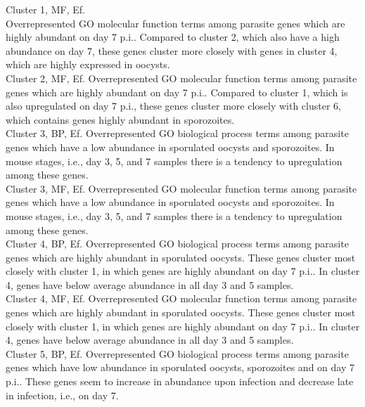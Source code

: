 \documentclass{article}
\begin{document}
  Cluster 1, MF, Ef.\\
  Overrepresented GO molecular function terms among parasite genes which are 
  highly abundant on day 7 p.i.. Compared to cluster 2, which also have a high
  abundance on day 7, these genes cluster more closely with genes in cluster 4, 
  which are highly expressed in oocysts.\\
  
  
  Cluster 2, MF, Ef.
  Overrepresented GO molecular function terms among parasite genes which are 
  highly abundant on day 7 p.i.. Compared to cluster 1, which is also upregulated 
  on day 7 p.i., these genes cluster more closely with cluster 6, which contains
  genes highly abundant in sporozoites.\\
  
  
  Cluster 3, BP, Ef.
  Overrepresented GO biological process terms among parasite genes which have a low
  abundance in sporulated oocysts and sporozoites. In mouse stages, i.e., day 3, 5, and 7 samples
  there is a tendency to upregulation among these genes.\\
  
  
  Cluster 3, MF, Ef.
  Overrepresented GO molecular function terms among parasite genes which have a low
  abundance in sporulated oocysts and sporozoites. In mouse stages, i.e., day 3, 5, and 7 samples
  there is a tendency to upregulation among these genes.\\
  
  
  Cluster 4, BP, Ef.
  Overrepresented GO biological process terms among parasite genes which are highly abundant in
  sporulated oocysts. These genes cluster most closely with cluster 1, in which genes are highly
  abundant on day 7 p.i.. In cluster 4, genes have below average abundance in all day 3 and 5 samples.\\
  
  
  Cluster 4, MF, Ef.
  Overrepresented GO molecular function terms among parasite genes which are highly abundant in
  sporulated oocysts. These genes cluster most closely with cluster 1, in which genes are highly
  abundant on day 7 p.i.. In cluster 4, genes have below average abundance in all day 3 and 5 samples.\\
  
  
  Cluster 5, BP, Ef.
  Overrepresented GO biological process terms among parasite genes which have low abundance
  in sporulated oocysts, sporozoites and on day 7 p.i.. These genes seem to increase in abundance
  upon infection and decrease late in infection, i.e., on day 7.\\
  
  
\end{document}
